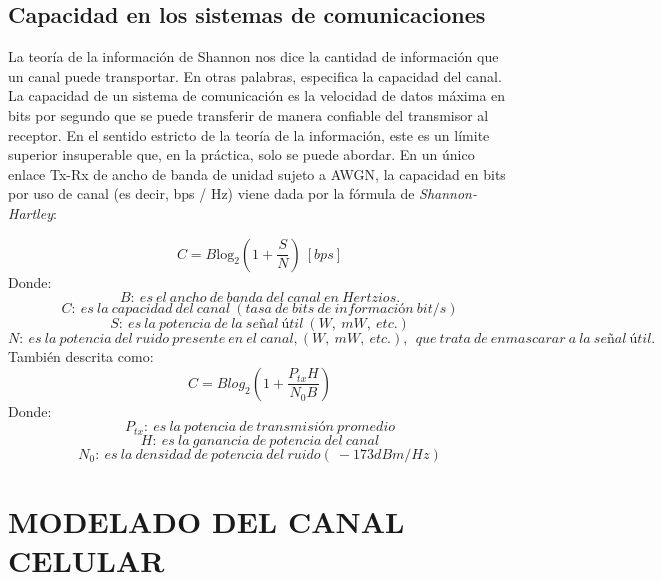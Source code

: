\subsection{Capacidad en los sistemas de comunicaciones}

La teoría de la información de Shannon nos dice la cantidad de información que un canal puede transportar. En otras palabras, especifica la capacidad del canal. La capacidad de un sistema de comunicación es la velocidad de datos máxima en bits por segundo que se puede transferir de manera confiable del transmisor al receptor. En el sentido estricto de la teoría de la información, este es un límite superior insuperable que, en la práctica, solo se puede abordar. En un único enlace Tx-Rx de ancho de banda de unidad sujeto a AWGN, la capacidad en bits por uso de canal (es decir, bps / Hz) viene dada por la fórmula de \emph{Shannon-Hartley}:\newline

\begin{equation}
C=B{{\mathrm{log}}_2 \left(1+\frac{S}{N}\right)\   [bps] }
\label{eqn:Shannon}
\end{equation}
Donde:
\[B:\ es\ el\ ancho\ de\ banda\ del\ canal\ en\ Hertzios.\]
\[C:\ es\ la\ capacidad\ del\ canal\ (tasa\ de\ bits\ de\ informaci\textrm{ó}n\ bit/s)\]
\[S:\ es\ la\ potencia\ de\ la\ se\textrm{\~{n}}al\ \textrm{ú}til\ (W,\ mW,\ etc.)\]
\[N:\ es\ la\ potencia\ del\ ruido\ presente\ en\ el\ canal,\left(W,\ mW,\ etc.\right),\ \ que\ trata\ de\ enmascarar\ a\ la\ se\textrm{\~{n}}al\ \textrm{ú}til.\] 
También descrita como:
\begin{equation}
    C =Blog_2(1 + \frac {P_{tx} H}{N_0B})
    \label{eqn:Shannon2}
\end{equation}
Donde:
\[P_{tx}:\ es\ la\ potencia\ de\ transmisión\ promedio\]
\[H:\ es\ la\ ganancia\ de\ potencia\ del\ canal\]
\[N_0:\ es\ la\ densidad\ de\ potencia\ del\ ruido (~-173 dBm/Hz)\]

\break

\section{MODELADO DEL CANAL CELULAR}

